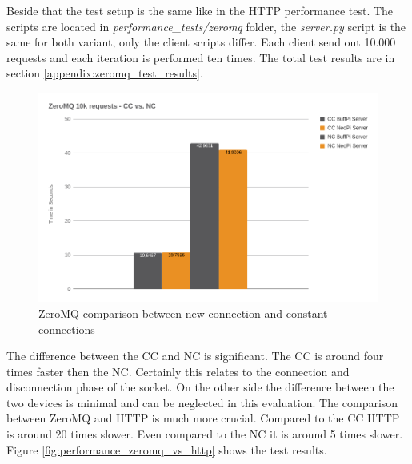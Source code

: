 Beside that the test setup is the same like in the \ac{HTTP} performance test.
The scripts are located in \textit{performance\_tests/zeromq} folder, the \textit{server.py} script is the same for both variant, only the client scripts differ.
Each client send out 10.000 requests and each iteration is performed ten times.
The total test results are in section \ref{appendix:zeromq_test_results}.

\begin{figure}[H]
    \centering
    \includegraphics[width=\textwidth]{resources/images/performance_zeromq_cc_vs_nc.png}
    \caption[ZeroMQ comparison between new connection and constant connections]{ZeroMQ comparison between new connection and constant connections}
    \label{fig:performance_zeromq_cc_vs_nc}
\end{figure}

The difference between the \ac{CC} and \ac{NC} is significant.
The \ac{CC} is around four times faster then the \ac{NC}.
Certainly this relates to the connection and disconnection phase of the socket.
On the other side the difference between the two devices is minimal and can be neglected in this evaluation.\newline
\newpage
The comparison between ZeroMQ and \ac{HTTP} is much more crucial.
Compared to the \ac{CC} \ac{HTTP} is around 20 times slower.
Even compared to the \ac{NC} it is around 5 times slower.
Figure \ref{fig:performance_zeromq_vs_http} shows the test results.

